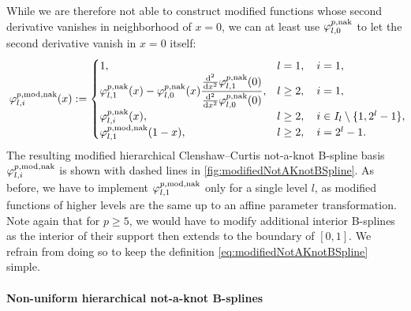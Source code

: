 While we are therefore not able to construct modified functions
whose second derivative vanishes in neighborhood of $x = 0$,
we can at least use $\varphi_{l,0}^{p,\mathrm{nak}}$ to let the
second derivative vanish in $x = 0$ itself:
\begin{equation}
  \label{eq:modifiedNotAKnotBSpline}
  \varphi_{l,i}^{p,\modified,\notaknot}(x)
  :=
  \begin{cases}
    1,&
    l = 1,\quad i = 1,\\
    \varphi_{l,1}^{p,\notaknot}(x)
    - \varphi_{l,0}^{p,\notaknot}(x)
    \dfrac{\frac{\diff^2}{\dx^2} \varphi_{l,1}^{p,\notaknot}(0)}%
    {\frac{\diff^2}{\dx^2} \varphi_{l,0}^{p,\notaknot}(0)},&
    l \ge 2,\quad i = 1,\\
    \varphi_{l,i}^{p,\notaknot}(x),&
    l \ge 2,\quad i \in I_l \setminus \{1, 2^l - 1\},\\
    \varphi_{l,1}^{p,\modified,\notaknot}(1 - x),&
    l \ge 2,\quad i = 2^l - 1.
  \end{cases}
  \hspace*{-2mm}
\end{equation}
The resulting modified hierarchical Clenshaw--Curtis not-a-knot B-spline basis
$\varphi_{l,i}^{p,\mathrm{mod},\mathrm{nak}}$ is shown with dashed lines
in \cref{fig:modifiedNotAKnotBSpline}.
As before, we have to implement $\varphi_{l,1}^{p,\mathrm{mod},\mathrm{nak}}$
only for a single level $l$, as modified functions of higher levels
are the same up to an affine parameter transformation.
Note again that for $p \ge 5$, we would have to modify additional
interior B-splines as the interior of their support then extends to the
boundary of $[0, 1]$.
We refrain from doing so to keep the definition
\eqref{eq:modifiedNotAKnotBSpline} simple.

\paragraph{Non-uniform hierarchical not-a-knot B-splines}

